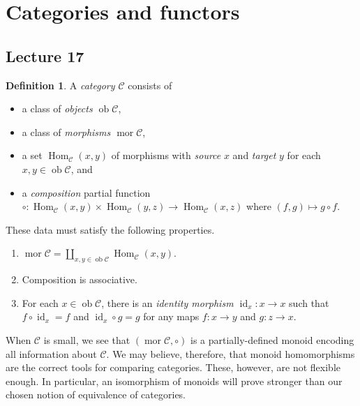 \documentclass[10pt,letterpaper,cm]{nupset}
\theoremstyle{definition}
\newtheorem{definition}{Definition}[subsection]
\theoremstyle{theorem}
\theoremstyle{remark}
\newcommand{\1}{\mathbf{1}}
\renewcommand{\c}{\mathscr{C}}
\newcommand{\0}{\vec 0}
\DeclareMathOperator{\id}{\mathrm{id}}
\DeclareMathOperator{\mor}{mor}
\DeclareMathOperator{\ob}{ob}
\DeclareMathOperator{\Hom}{Hom}
\begin{document}
\section{Categories and functors}

\subsection{Lecture 17}

\begin{definition} 
A \textit{category $\c$} consists of
\begin{itemize}
\item a class of \textit{objects $\ob{\c}$},
\item a class of \textit{morphisms $\mor{\c}$},
\item a set $\Hom_{\c}(x,y)$ of morphisms with \textit{source} $x$ and \textit{target} $y$ for each $x,y \in \ob{\c}$, and
\item a \textit{composition} partial function $\circ : \Hom_{\c}(x,y) \times \Hom_{\c}(y,z) \to \Hom_{\c}(x,z)$ where $(f,g) \mapsto g \circ f$.
\end{itemize}
These data must satisfy the following properties.
\begin{enumerate}[label=(\roman*)]
\item $\mor{\c} = \coprod_{x,y\in \ob{\c}} \Hom_{\c}(x,y)$.
\item Composition is associative.
\item For each $x\in \ob{\c}$, there is an \textit{identity morphism $\id_x: x \to x$} such that $f \circ \id_x = f$ and $\id_x \circ g = g$ for any maps $f: x \to y$ and $g: z \to x$.
\end{enumerate}
\end{definition}

\smallskip

When $\c$ is small, we see that $\left(\mor{\c}, \circ\right)$ is a partially-defined monoid encoding all information about $\c$. We may believe, therefore, that monoid homomorphisms are the correct tools for comparing categories. These, however, are not flexible enough. In particular, an isomorphism of monoids will prove stronger than our chosen notion of equivalence of categories.

\smallskip
\end{document}
